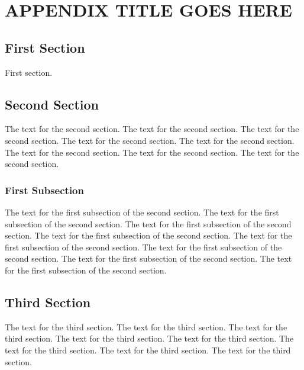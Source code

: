\chapter{APPENDIX TITLE GOES HERE} \label{ap:a}

\section{First Section}
First section.

\section{Second Section}
The text for the second section.  The text for the second section.
The text for the second section.  The text for the second section.
The text for the second section.  The text for the second section.
The text for the second section.  The text for the second section.

\subsection{First Subsection}
The text for the first subsection of the second section.  The text for
the first subsection of the second section.  The text for the first
subsection of the second section.  The text for the first subsection
of the second section.  The text for the first subsection of the
second section.  The text for the first subsection of the second
section.  The text for the first subsection of the second section.
The text for the first subsection of the second section.

\section{Third Section}
The text for the third section.  The text for the third section.  The
text for the third section.  The text for the third section.  The text
for the third section.  The text for the third section.  The text for
the third section.  The text for the third section.
